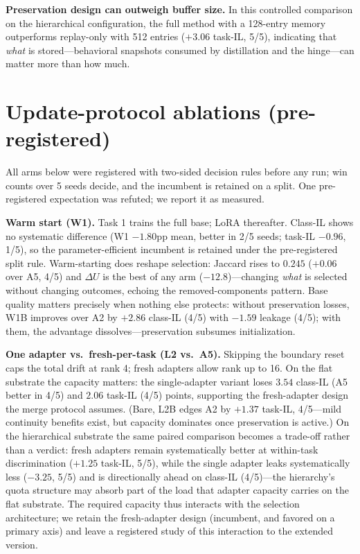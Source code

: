 \documentclass{article}
\begin{document}
\textbf{Preservation design can outweigh buffer size.} In this controlled comparison on the hierarchical configuration, the full method with a 128-entry memory outperforms replay-only with 512 entries ($+3.06$ task-IL, 5/5), indicating that \emph{what} is stored---behavioral snapshots consumed by distillation and the hinge---can matter more than how much.

\section{Update-protocol ablations (pre-registered)}
\label{sec:ablations}
All arms below were registered with two-sided decision rules before any run; win counts over 5 seeds decide, and the incumbent is retained on a split. One pre-registered expectation was refuted; we report it as measured.

\textbf{Warm start (W1).} Task 1 trains the full base; LoRA thereafter. Class-IL shows no systematic difference (W1 $-1.80$pp mean, better in 2/5 seeds; task-IL $-0.96$, 1/5), so the parameter-efficient incumbent is retained under the pre-registered split rule. Warm-starting does reshape selection: Jaccard rises to $0.245$ ($+0.06$ over A5, 4/5) and $\Delta U$ is the best of any arm ($-12.8$)---changing \emph{what} is selected without changing outcomes, echoing the removed-components pattern. Base quality matters precisely when nothing else protects: without preservation losses, W1B improves over A2 by $+2.86$ class-IL (4/5) with $-1.59$ leakage (4/5); with them, the advantage dissolves---preservation subsumes initialization.

\textbf{One adapter vs.\ fresh-per-task (L2 vs.\ A5).} Skipping the boundary reset caps the total drift at rank 4; fresh adapters allow rank up to 16. On the flat substrate the capacity matters: the single-adapter variant loses $3.54$ class-IL (A5 better in 4/5) and $2.06$ task-IL (4/5) points, supporting the fresh-adapter design the merge protocol assumes. (Bare, L2B edges A2 by $+1.37$ task-IL, 4/5---mild continuity benefits exist, but capacity dominates once preservation is active.) On the hierarchical substrate the same paired comparison becomes a trade-off rather than a verdict: fresh adapters remain systematically better at within-task discrimination ($+1.25$ task-IL, 5/5), while the single adapter leaks systematically less ($-3.25$, 5/5) and is directionally ahead on class-IL (4/5)---the hierarchy's quota structure may absorb part of the load that adapter capacity carries on the flat substrate. The required capacity thus interacts with the selection architecture; we retain the fresh-adapter design (incumbent, and favored on a primary axis) and leave a registered study of this interaction to the extended version.
\end{document}
